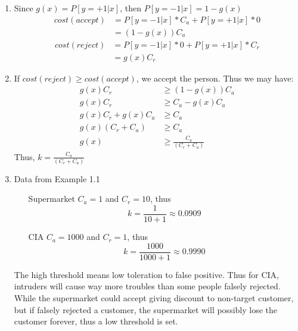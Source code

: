 \documentclass{article}
\def\math#1{$#1$}
\begin{document}
\begin{enumerate}
    \item Since \math{g(x) = P[y = +1|x]}, then \math{P[y = -1|x] = 1 - g(x)}
        \begin{equation}
            \begin{split}
                cost(accept) &= P[y = -1|x] * C_a + P[y = +1|x] * 0 \\
                &= (1 - g(x))C_a
            \end{split}
        \end{equation}
        \begin{equation}
            \begin{split}
                cost(reject) &= P[y = -1|x] * 0 + P[y = +1|x] * C_r \\
                &= g(x)C_r
            \end{split}
        \end{equation}
    \item If \math{cost(reject) \geq cost(accept)}, we accept the person. Thus we may have:
    \begin{equation}
        \begin{split}
            g(x)C_r &\geq (1 - g(x))C_a \\
            g(x)C_r &\geq C_a - g(x)C_a \\
            g(x)C_r + g(x)C_a &\geq C_a \\
            g(x)(C_r + C_a) &\geq C_a \\
            g(x) &\geq \frac{C_a}{(C_r + C_a)}
        \end{split}
    \end{equation}
    Thus, \math{k = \frac{C_a}{(C_r + C_a)}}
    \item Data from Example 1.1
        \begin{itemize}
            \item [Supermarket] \math{C_a = 1} and \math{C_r = 10}, thus
            \begin{equation}
                k = \frac{1}{10 + 1} \approx 0.0909
            \end{equation}
            \item [CIA] \math{C_a = 1000} and \math{C_r = 1}, thus
            \begin{equation}
                k = \frac{1000}{1000 + 1} \approx 0.9990
            \end{equation}
        \end{itemize}
        The high threshold means low toleration to false positive. Thus for CIA, intruders will cause way more troubles than some people falsely rejected. While the supermarket could accept giving discount to non-target customer, but if falsely rejected a customer, the supermarket will possibly lose the customer forever, thus a low threshold is set.
\end{enumerate}
\end{document}
